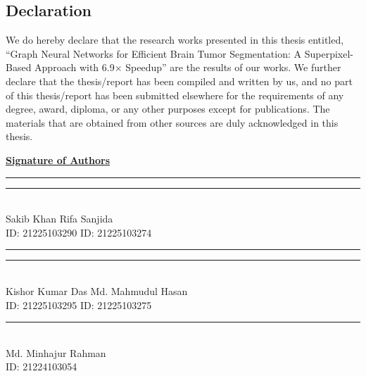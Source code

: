 \begin{center}
    \section*{Declaration}
\end{center}
\large 


We do hereby declare that the research works presented in this thesis entitled, “Graph Neural Networks for Efficient Brain Tumor Segmentation:
A Superpixel-Based Approach with 6.9× Speedup” are the results of our works. We further declare that the thesis/report has been compiled and written by us, and no part of this thesis/report has been submitted elsewhere for the requirements of any degree, award, diploma, or any other purposes except for publications. The materials that are obtained from other sources are duly acknowledged in this thesis.


\vspace{10mm}
\begin{flushleft}

\textbf{\underline{Signature of Authors}} \null\hfill  

\vspace{20mm}

\parbox{6cm}{\centering\rule{6cm}{0.4pt}\vspace{2mm}} \null\hfill 
\parbox{6cm}{\centering\rule{6cm}{0.4pt}\vspace{2mm}}\\
Sakib Khan \null\hfill Rifa Sanjida \\
ID: 21225103290  \null\hfill  ID: 21225103274 \\

\vspace{15mm}

\parbox{6cm}{\centering\rule{6cm}{0.4pt}\vspace{2mm}} \null\hfill 
\parbox{6cm}{\centering\rule{6cm}{0.4pt}\vspace{2mm}}\\
Kishor Kumar Das  \null\hfill   Md. Mahmudul Hasan\\
ID: 21225103295  \null\hfill  ID: 21225103275\\

\vspace{15mm}

\parbox{6cm}{\centering\rule{6cm}{0.4pt}\vspace{2mm}}\\
Md. Minhajur Rahman\\
ID: 21224103054 \\ 
\end{flushleft}